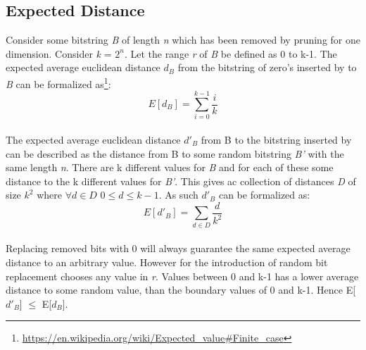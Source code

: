 \subsection{Expected Distance}
\label{exp:dist}
Consider some bitstring \textit{B} of length \textit{n} which has been removed by \qs{} pruning for one dimension. Consider \textit{k} = $2^n$. Let the range \textit{r} of \textit{B} be defined as 0 to k-1. The expected average euclidean distance \textit{$d_B$} from the bitstring of zero's inserted by \qs{} to \textit{B} can be formalized as\footnote{\url{https://en.wikipedia.org/wiki/Expected_value\#Finite_case}}:
\\
$$E[\textit{$d_B$}] = \sum_{i=0}^{k - 1} \dfrac{i}{k}$$
\\
The expected average euclidean distance \textit{$d'_B$} from B to the bitstring inserted by \qsr{} can be described as the distance from B to some random bitstring \textit{B'} with the same length \textit{n}. There are k different values for \textit{B} and for each of these some distance to the k different values for \textit{B'}. This gives ac collection of distances \textit{D} of size $k^2$ where $\forall{}\textit{d}\in{}\textit{D}$ $0\leq{}d\leq{}k-1$. As such \textit{$d'_B$} can be formalized as:
\\
$$E[\textit{$d'_B$}] = \sum_{d\in\textit{D}}^{}\dfrac{d}{k^2}$$
\\
Replacing removed bits with 0 will always guarantee the same expected average distance to an arbitrary value. However for \qsr{} the introduction of random bit replacement chooses any value in \textit{r}. Values between 0 and k-1 has a lower average distance to some random value, than the boundary values of 0 and k-1. Hence E[\textit{$d'_B$}] $\leq{}$ E[\textit{$d_B$}].